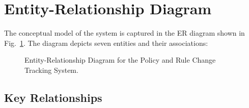 \documentclass[conference]{IEEEtran}
\begin{document}
\section{Entity-Relationship Diagram}

The conceptual model of the system is captured in the ER diagram shown in Fig.~\ref{fig:erdiagram}. The diagram depicts seven entities and their associations:

\begin{figure}[H]
  \centering
  \caption{Entity-Relationship Diagram for the Policy and Rule Change Tracking System.}
  \label{fig:erdiagram}
\end{figure}

\subsection{Key Relationships}
\end{document}
